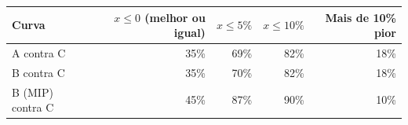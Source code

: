 \begin{tabular}{lrrrr}
\toprule
Curva & $x\le 0$ (melhor ou igual) & $x\le 5\%$ & $x\le 10\%$ & Mais de 10\% pior \\
\midrule
A contra C & 35\% & 69\% & 82\% & 18\% \\
B contra C & 35\% & 70\% & 82\% & 18\% \\
B (MIP) contra C & 45\% & 87\% & 90\% & 10\% \\
\bottomrule
\end{tabular}
